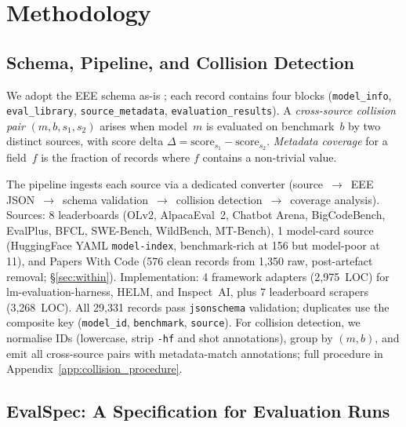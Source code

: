 \documentclass[11pt]{article}
\begin{document}
\section{Methodology}\label{sec:methodology}

\subsection{Schema, Pipeline, and Collision Detection}\label{sec:schema}

We adopt the EEE schema as-is \citep{evaleval-2026}; each record
contains four blocks (\texttt{model\_info},
\texttt{eval\_library}, \texttt{source\_metadata},
\texttt{evaluation\_results}). A \emph{cross-source collision
pair} $(m, b, s_1, s_2)$ arises when model~$m$ is evaluated on
benchmark~$b$ by two distinct sources, with score delta
$\Delta = \text{score}_{s_1} - \text{score}_{s_2}$.
\emph{Metadata coverage} for a field~$f$ is the fraction of
records where $f$ contains a non-trivial value.

The pipeline ingests each source via a dedicated converter
(source~$\to$~EEE JSON~$\to$~schema validation~$\to$~collision
detection~$\to$~coverage analysis). Sources: 8 leaderboards
(OLv2, AlpacaEval~2, Chatbot Arena, BigCodeBench, EvalPlus,
BFCL, SWE-Bench, WildBench, MT-Bench), 1 model-card source
(HuggingFace YAML \texttt{model-index}, benchmark-rich at 156
but model-poor at 11), and Papers With Code
(576 clean records from 1{,}350 raw, post-artefact removal;
\S\ref{sec:within}). Implementation: 4 framework adapters
(2{,}975~LOC) for lm-evaluation-harness, HELM, and Inspect~AI,
plus 7 leaderboard scrapers (3{,}268~LOC). All 29{,}331 records
pass \texttt{jsonschema} validation; duplicates use the composite
key (\texttt{model\_id}, \texttt{benchmark}, \texttt{source}).
For collision detection, we normalise IDs (lowercase, strip
\texttt{-hf} and shot annotations), group by $(m,b)$, and emit
all cross-source pairs with metadata-match annotations; full
procedure in Appendix~\ref{app:collision_procedure}.

\subsection{EvalSpec: A Specification for Evaluation Runs}\label{sec:evalspec}
\end{document}
